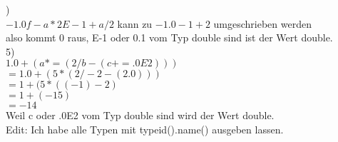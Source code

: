 \documentclass[12pt]{article}
\begin{document}
)\\[4pt]
\hspace*{3mm}$-1.0f - a*2E-1 + a/2 $ kann zu $-1.0 - 1 + 2$ umgeschrieben werden\\
\hspace*{3mm}also kommt 0 raus, E-1 oder 0.1 vom Typ double sind ist der Wert double.\\[4pt]
5)\\ [4pt]
\hspace*{3mm}$1.0 + (a *= ( 2/b - (c += .0E2)))$\\
\hspace*{3mm}$= 1.0 +( 5 * ( 2/-2 - (2.0)))$ \\
\hspace*{3mm}$= 1 + (5 * ((-1) - 2 )$ \\ 
\hspace*{3mm}$= 1 + (-15)$ \\ 
\hspace*{3mm}$ = -14$  \\
\hspace*{3mm}Weil c oder .0E2 vom Typ double sind wird der Wert double.\\[40 pt]
Edit: Ich habe alle Typen mit typeid().name() ausgeben lassen. 
\end{document}
